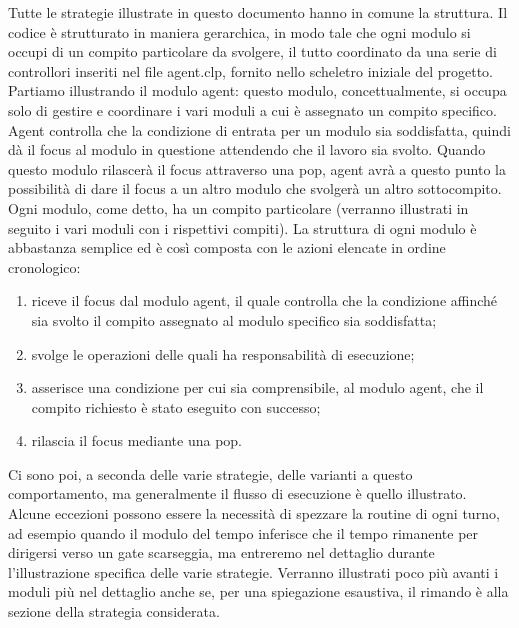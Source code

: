 Tutte le strategie illustrate in questo documento hanno in comune la struttura.
Il codice è strutturato in maniera gerarchica, in modo tale che ogni modulo si occupi di un compito particolare da svolgere, il tutto coordinato da una serie di controllori inseriti nel file {\color{red}agent.clp}, fornito nello scheletro iniziale del progetto.
Partiamo illustrando il modulo agent: questo modulo, concettualmente, si occupa solo di gestire e coordinare i vari moduli a cui è assegnato un compito specifico. Agent controlla che la condizione di entrata per un modulo sia soddisfatta, quindi dà il focus al modulo in questione attendendo che il lavoro sia svolto. Quando questo modulo rilascerà il focus attraverso una pop, agent avrà a questo punto la possibilità di dare il focus a un altro modulo che svolgerà un altro sottocompito.
Ogni modulo, come detto, ha un compito particolare (verranno illustrati in seguito i vari moduli con i rispettivi compiti). La struttura di ogni modulo è abbastanza semplice ed è così composta con le azioni elencate in ordine cronologico: 
\begin{enumerate}
	\item riceve il focus dal modulo agent, il quale controlla che la condizione affinché sia svolto il compito assegnato al modulo specifico sia soddisfatta;
	\item svolge le operazioni delle quali ha responsabilità di esecuzione;
	\item asserisce una condizione per cui sia comprensibile, al modulo agent, che il compito richiesto è stato eseguito con successo;
	\item rilascia il focus mediante una pop.
\end{enumerate}
Ci sono poi, a seconda delle varie strategie, delle varianti a questo comportamento, ma generalmente il flusso di esecuzione è quello illustrato. Alcune eccezioni possono essere la necessità di spezzare la routine di ogni turno, ad esempio quando il modulo del tempo inferisce che il tempo rimanente per dirigersi verso un gate scarseggia, ma entreremo nel dettaglio durante l'illustrazione specifica delle varie strategie.
Verranno illustrati poco più avanti i moduli più nel dettaglio anche se, per una spiegazione esaustiva, il rimando è alla sezione della strategia considerata.

